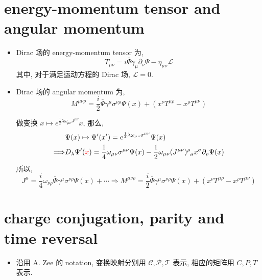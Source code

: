 \section{energy-momentum tensor and angular momentum}
\begin{itemize}
	\item Dirac 场的 energy-momentum tensor 为,
	\begin{equation}
		T_{\mu \nu} = i \bar{\Psi} \gamma_\mu \partial_\nu \Psi - \eta_{\mu \nu} \mathcal{L}
	\end{equation}
	其中, 对于满足运动方程的 Dirac 场, $\mathcal{L} = 0$.
	
	\item  Dirac 场的 angular momentum 为,
	\begin{equation}
		M^{\mu \nu \rho} = \frac{i}{2} \bar{\Psi} \gamma^\mu \sigma^{\nu \rho} \Psi(x) + (x^\nu T^{\mu \rho} - x^\rho T^{\mu \nu})
	\end{equation}
	
	\begin{tcolorbox}[title=calculation:]
		做变换 $x \mapsto e^{\frac{1}{2} \lambda \omega_{\mu \nu} J^{\mu \nu}} x$, 那么,
		\begin{align}
			& \Psi(x) \mapsto \Psi'(x') = e^{\frac{1}{4} \lambda \omega_{\mu \nu} \sigma^{\mu \nu}} \Psi(x) \notag \\
			\Longrightarrow & D_\lambda \Psi'(\mathcolor{red}{x}) = \frac{1}{4} \omega_{\mu \nu} \sigma^{\mu \nu} \Psi(x) - \frac{1}{2} \omega_{\mu \nu} \tensor{(J^{\mu \nu})}{^\rho_\sigma} x^\sigma \partial_\rho \Psi(x)
		\end{align}
		所以,
		\begin{equation}
			J^\mu = \frac{i}{4} \omega_{\nu \rho} \bar{\Psi} \gamma^\mu \sigma^{\nu \rho} \Psi(x) + \cdots \Longrightarrow M^{\mu \nu \rho} = \frac{i}{2} \bar{\Psi} \gamma^\mu \sigma^{\nu \rho} \Psi(x) + (x^\nu T^{\mu \rho} - x^\rho T^{\mu \nu})
		\end{equation}
	\end{tcolorbox}
\end{itemize}

\section{charge conjugation, parity and time reversal}
\begin{itemize}
	\item 沿用 A. Zee 的 notation, 变换映射分别用 $\mathcal{C}, \mathcal{P}, \mathcal{T}$ 表示, 相应的矩阵用 $C, P, T$ 表示.
\end{itemize}

